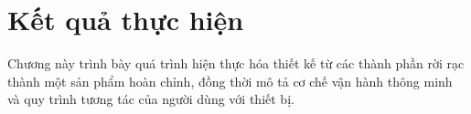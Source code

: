\chapter{Kết quả thực hiện}\label{chap:ket_qua_thuc_hien}
    Chương này trình bày quá trình hiện thực hóa thiết kế từ các thành phần rời rạc thành một sản phẩm hoàn chỉnh, đồng thời mô tả cơ chế vận hành thông minh và quy trình tương tác của người dùng với thiết bị.
    
    
    
    
    